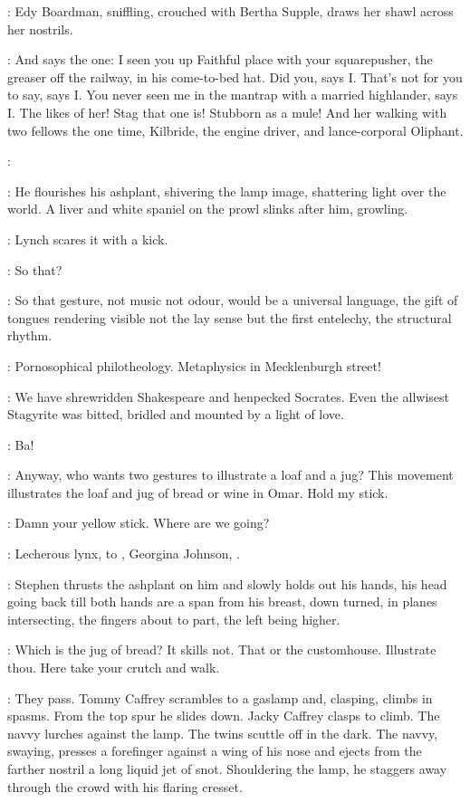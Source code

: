 :
Edy Boardman,
sniffling,
crouched with Bertha Supple,
draws her shawl across her nostrils.

\Edy:
And says the one:
I seen you up Faithful place with your squarepusher,
the greaser off the railway,
in his come-to-bed hat.
Did you,
says I.
That's not for you to say,
says I.
You never seen
me in the mantrap with a married highlander,
says I.
The likes of her!
Stag that one is!
Stubborn as a mule!
And her walking with two fellows the one time,
Kilbride,
the engine driver,
and lance-corporal Oliphant.

\Stephen:

:
He flourishes his ashplant,
shivering the lamp image,
shattering light over the world.
A liver and white spaniel on the prowl slinks after him,
growling.

:
Lynch scares it with a kick.

\Lynch:
So that?

\Stephen:
So that gesture,
not music not odour,
would be a universal language,
the gift of tongues rendering visible not the lay sense
but the first entelechy,
the structural rhythm.

\Lynch:
Pornosophical philotheology.
Metaphysics in Mecklenburgh street!

\Stephen:
We have shrewridden Shakespeare and henpecked Socrates.
Even the allwisest Stagyrite was bitted,
bridled and mounted by a light of love.

\Lynch:
Ba!

\Stephen:
Anyway,
who wants two gestures to illustrate a loaf and a jug?
This movement illustrates the loaf and jug of bread or wine in Omar.
Hold my stick.

\Lynch:
Damn your yellow stick.
Where are we going?

\Stephen:
Lecherous lynx,
to ,
Georgina Johnson,
.

:
Stephen thrusts the ashplant on him and slowly holds out his hands,
his head going back till both hands are a span from his breast,
down turned,
in planes intersecting,
the fingers about to part,
the left being higher.

\Lynch:
Which is the jug of bread? It skills not.
That or the customhouse.
Illustrate thou.
Here take your crutch and walk.

:
They pass.
Tommy Caffrey scrambles to a gaslamp and,
clasping,
climbs in spasms.
From the top spur he slides down.
Jacky Caffrey clasps to climb.
The navvy lurches against the lamp.
The twins scuttle off in the dark.
The navvy,
swaying,
presses a forefinger against a wing of his nose and
ejects from the farther nostril a long liquid jet of snot.
Shouldering the lamp,
he staggers away through the crowd with his flaring cresset.

